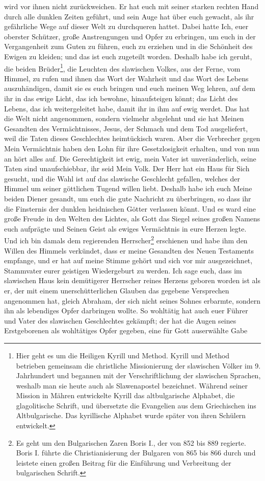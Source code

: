 wird vor ihnen nicht zurückweichen. Er hat euch mit seiner starken rechten Hand durch alle dunklen Zeiten geführt, und sein Auge hat über euch gewacht, als ihr gefährliche Wege auf dieser Welt zu durchqueren hattet. Dabei hatte Ich, euer oberster Schützer, große Anstrengungen und Opfer zu erbringen, um euch in der Vergangenheit zum Guten zu führen, euch zu erziehen und in die Schönheit des Ewigen zu kleiden; und das ist euch zugeteilt worden. Deshalb habe ich geruht, die beiden Brüder\footnote{Hier geht es um die Heiligen Kyrill und Method. Kyrill und Method betrieben gemeinsam die christliche Missionierung der slawischen Völker im 9. Jahrhundert und begannen mit der Verschriftlichung der slawischen Sprachen, weshalb man sie heute auch als Slawenapostel bezeichnet. Während seiner Mission in Mähren entwickelte Kyrill das altbulgarische Alphabet, die glagolitische Schrift, und übersetzte die Evangelien aus dem Griechischen ins Altbulgarische. Das kyrillische Alphabet wurde später von ihren Schülern entwickelt.}, die Leuchten des slawischen Volkes, aus der Ferne, vom Himmel, zu rufen und ihnen das Wort der Wahrheit und das Wort des Lebens auszuhändigen, damit sie es euch bringen und euch meinen Weg lehren, auf dem ihr in das ewige Licht, das ich bewohne, hinaufsteigen könnt; das Licht des Lebens, das ich weitergeleitet habe, damit ihr in ihm auf ewig werdet. Das hat die Welt nicht angenommen, sondern vielmehr abgelehnt und sie hat Meinen Gesandten des Vermächtnisses, Jesus, der Schmach und dem Tod ausgeliefert, weil die Taten dieses Geschlechtes heimtückisch waren. Aber die Verbrecher gegen Mein Vermächtnis haben den Lohn für ihre Gesetzlosigkeit erhalten, und von nun an hört alles auf. Die Gerechtigkeit ist ewig, mein Vater ist unveränderlich, seine Taten sind unaufschiebbar, ihr seid Mein Volk. Der Herr hat ein Haus für Sich gesucht, und die Wahl ist auf das slawische Geschlecht gefallen, welches der Himmel um seiner göttlichen Tugend willen liebt. Deshalb habe ich euch Meine beiden Diener gesandt, um euch die gute Nachricht zu überbringen, so dass ihr die Finsternis der dunklen heidnischen Götter verlassen könnt. Und es ward eine große Freude in den Welten des Lichtes, als Gott das Siegel seines großen Namens euch aufprägte und Seinen Geist als ewiges Vermächtnis in eure Herzen legte. Und ich bin damals dem regierenden Herrscher\footnote{Es geht um den Bulgarischen Zaren Boris I., der von 852 bis 889 regierte. Boris I. führte die Christianisierung der Bulgaren von 865 bis 866 durch und leistete einen großen Beitrag für die Einführung und Verbreitung der bulgarischen Schrift.} erschienen und habe ihm den Willen des Himmels verkündet, dass er meine Gesandten des Neuen Testaments empfange, und er hat auf meine Stimme gehört und sich vor mir ausgezeichnet, Stammvater eurer geistigen Wiedergeburt zu werden. Ich sage euch, dass im slawischen Haus kein demütigerer Herrscher reines Herzens geboren worden ist als er, der mit einem unerschütterlichen Glauben das gegebene Versprechen angenommen hat, gleich Abraham, der sich nicht seines Sohnes erbarmte, sondern ihn als lebendiges Opfer darbringen wollte. So wohltätig hat auch euer Führer und Vater des slawischen Geschlechtes gekämpft; der hat die Augen seines Erstgeborenen als wohltätiges Opfer gegeben, eine für Gott auserwählte Gabe 